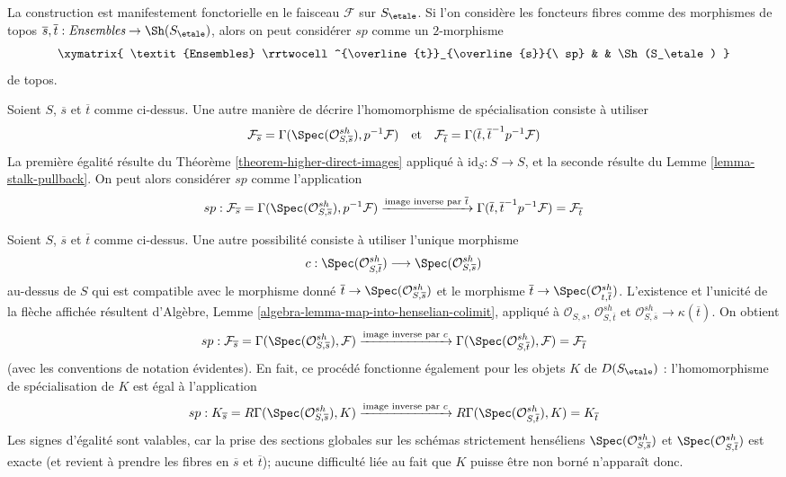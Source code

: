 \medskip\noindent
La construction est manifestement fonctorielle en le faisceau $\mathcal{F}$ sur
$S_\etale$. Si l'on considère les foncteurs fibres comme des morphismes de topos
$\overline{s}, \overline{t} : \textit{Ensembles} \to \Sh(S_\etale)$, alors
on peut considérer $sp$ comme un $2$-morphisme
$$
\xymatrix{
\textit{Ensembles}
\rrtwocell^{\overline{t}}_{\overline{s}}{\ sp}
&
&
\Sh(S_\etale)
}
$$
de topos.

\begin{remark}
\label{remark-alternative-sp}
Soient $S$, $\overline{s}$ et $\overline{t}$ comme ci-dessus.
Une autre manière de décrire l'homomorphisme de spécialisation consiste à utiliser
$$
\mathcal{F}_{\overline{s}} =
\Gamma(\Spec(\mathcal{O}^{sh}_{S, \overline{s}}), p^{-1}\mathcal{F})
\quad\text{et}\quad
\mathcal{F}_{\overline{t}} = \Gamma(\overline{t},
\overline{t}^{-1}p^{-1}\mathcal{F})
$$
La première égalité résulte du Théorème \ref{theorem-higher-direct-images}
appliqué à $\text{id}_S : S \to S$, et la seconde résulte
du Lemme \ref{lemma-stalk-pullback}. On peut alors considérer $sp$
comme l'application
$$
sp :
\mathcal{F}_{\overline{s}} =
\Gamma(\Spec(\mathcal{O}^{sh}_{S, \overline{s}}), p^{-1}\mathcal{F})
\xrightarrow{\text{image inverse par }\overline{t}}
\Gamma(\overline{t}, \overline{t}^{-1}p^{-1}\mathcal{F}) =
\mathcal{F}_{\overline{t}}
$$
\end{remark}

\begin{remark}
\label{remark-another-sp}
Soient $S$, $\overline{s}$ et $\overline{t}$ comme ci-dessus.
Une autre possibilité consiste à utiliser l'unique morphisme
$$
c :
\Spec(\mathcal{O}^{sh}_{S, \overline{t}})
\longrightarrow
\Spec(\mathcal{O}^{sh}_{S, \overline{s}})
$$
au-dessus de $S$ qui est compatible avec le morphisme donné
$\overline{t} \to \Spec(\mathcal{O}^{sh}_{S, \overline{s}})$
et le morphisme
$\overline{t} \to \Spec(\mathcal{O}^{sh}_{t, \overline{t}})$.
L'existence et l'unicité de la flèche affichée
résultent d'Algèbre, Lemme \ref{algebra-lemma-map-into-henselian-colimit},
appliqué à $\mathcal{O}_{S, s}$, $\mathcal{O}^{sh}_{S, \overline{t}}$ et
$\mathcal{O}^{sh}_{S, \overline{s}} \to \kappa(\overline{t})$.
On obtient
$$
sp :
\mathcal{F}_{\overline{s}} =
\Gamma(\Spec(\mathcal{O}^{sh}_{S, \overline{s}}), \mathcal{F})
\xrightarrow{\text{image inverse par }c}
\Gamma(\Spec(\mathcal{O}^{sh}_{S, \overline{t}}), \mathcal{F}) =
\mathcal{F}_{\overline{t}}
$$
(avec les conventions de notation évidentes).
En fait, ce procédé fonctionne également pour les objets $K$ de $D(S_\etale)$ :
l'homomorphisme de spécialisation de $K$ est égal à l'application
$$
sp :
K_{\overline{s}} =
R\Gamma(\Spec(\mathcal{O}^{sh}_{S, \overline{s}}), K)
\xrightarrow{\text{image inverse par }c}
R\Gamma(\Spec(\mathcal{O}^{sh}_{S, \overline{t}}), K) =
K_{\overline{t}}
$$
Les signes d'égalité sont valables, car la prise des sections globales sur
les schémas strictement henséliens
$\Spec(\mathcal{O}^{sh}_{S, \overline{s}})$ et
$\Spec(\mathcal{O}^{sh}_{S, \overline{t}})$
est exacte (et revient à prendre les fibres en $\overline{s}$ et $\overline{t}$);
aucune difficulté liée au fait que $K$ puisse être non borné
n'apparaît donc.
\end{remark}

